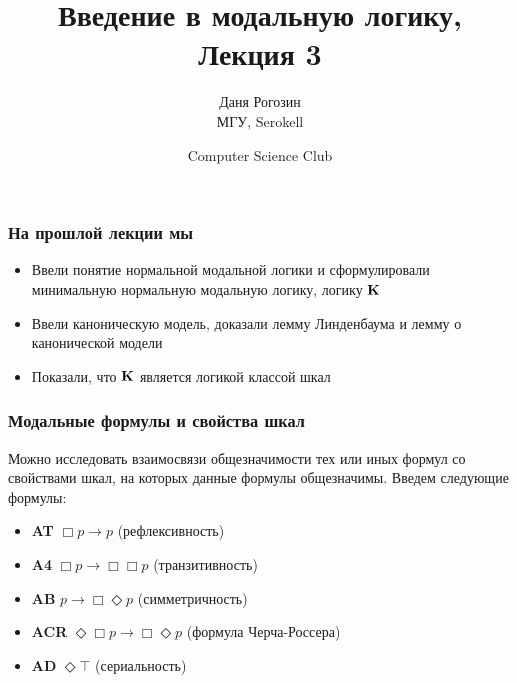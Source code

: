 \documentclass[pdf,utf8,russian,aspectratio=169]{beamer}
\title{Введение в модальную логику, \\ Лекция 3}
\author{Даня Рогозин \\ МГУ, Serokell}
\date{Computer Science Club}
\begin{document}
\maketitle

\begin{frame}
  \frametitle{На прошлой лекции мы}

  \begin{itemize}
    \item Ввели понятие нормальной модальной логики и сформулировали минимальную нормальную модальную логику, логику ${\bf K}$
    \item Ввели каноническую модель, доказали лемму Линденбаума и лемму о канонической модели
    \item Показали, что ${\bf K}$ является логикой классой шкал
  \end{itemize}
\end{frame}

\begin{frame}
  \frametitle{Модальные формулы и свойства шкал}

  Можно исследовать взаимосвязи общезначимости тех или иных формул со свойствами шкал, на которых данные формулы общезначимы. Введем следующие формулы:

  \begin{itemize}
    \item {\bf AT} $\Box p \to p$ (рефлексивность)
    \item {\bf A4} $\Box p \to \Box \Box p$ (транзитивность)
    \item {\bf AB} $p \to \Box \Diamond p$ (симметричность)
    \item {\bf ACR} $\Diamond \Box p \to \Box \Diamond p$ (формула Черча-Россера)
    \item {\bf AD} $\Diamond \top$ (сериальность)
  \end{itemize}
\end{frame}
\end{document}
